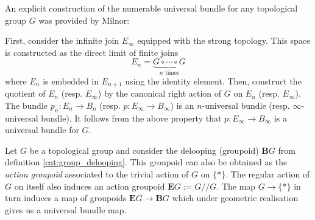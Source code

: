     An explicit construction of the numerable universal bundle for any topological group $G$ was provided by Milnor:
    \begin{construct}
        First, consider the infinite join $E_\infty$ equipped with the strong topology. This space is constructed as the direct limit of finite joins \[E_n=\underbrace{G\circ\cdots\circ G}_{n\text{ times}}\] where $E_n$ is embedded in $E_{n+1}$ using the identity element. Then, construct the quotient of $E_n$ (resp. $E_\infty$) by the canonical right action of $G$ on $E_n$ (resp. $E_\infty$). The bundle $p_n:E_n\rightarrow B_n$ (resp. $p:E_\infty\rightarrow B_\infty$) is an $n$-universal bundle (resp. $\infty$-universal bundle). It follows from the above property that $p:E_\infty\rightarrow B_\infty$ is a universal bundle for $G$.
    \end{construct}

    \begin{construct}
        Let $G$ be a topological group and consider the delooping (groupoid) $\mathbf{B}G$ from definition \ref{cat:group_delooping}. This groupoid can also be obtained as the \textit{action groupoid} associated to the trivial action of $G$ on $\{\ast\}$. The regular action of $G$ on itself also induces an action groupoid $\mathbf{E}G:=G//G$. The map $G\rightarrow\{\ast\}$ in turn induces a map of groupoids $\mathbf{E}G\rightarrow\mathbf{B}G$ which under geometric realisation gives us a universal bundle map.
    \end{construct}